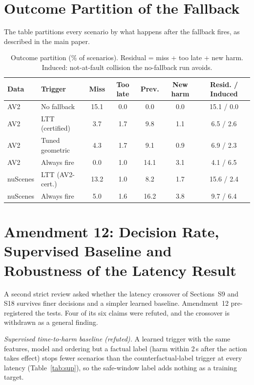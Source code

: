 \documentclass[lettersize,journal]{IEEEtran}
\begin{document}
\section{Outcome Partition of the Fallback}
\label{sec:s-partition}
The table partitions every scenario by what happens after the fallback fires, as described in the main paper.

\begin{table}[h]
\caption{Outcome partition (\% of scenarios). Residual = miss + too late +
new harm. Induced: not-at-fault collision the no-fallback run avoids.}
\label{tab:cost}
\centering
\scriptsize
\setlength{\tabcolsep}{3pt}
\begin{tabular}{llccccc}
\toprule
Data & Trigger & Miss & Too late & Prev. & New harm & Resid. / Induced \\
\midrule
AV2 & No fallback & 15.1 & 0.0 & 0.0 & 0.0 & 15.1 / 0.0 \\
AV2 & LTT (certified) & 3.7 & 1.7 & 9.8 & 1.1 & 6.5 / 2.6 \\
AV2 & Tuned geometric & 4.3 & 1.7 & 9.1 & 0.9 & 6.9 / 2.3 \\
AV2 & Always fire & 0.0 & 1.0 & 14.1 & 3.1 & 4.1 / 6.5 \\
nuScenes & LTT (AV2-cert.) & 13.2 & 1.0 & 8.2 & 1.7 & 15.6 / 2.4 \\
nuScenes & Always fire & 5.0 & 1.6 & 16.2 & 3.8 & 9.7 / 6.4 \\
\bottomrule
\end{tabular}
\end{table}

\section{Amendment 12: Decision Rate, Supervised Baseline and Robustness of the Latency Result}
\label{sec:s-a12}
A second strict review asked whether the latency crossover of Sections~S9
and S18 survives finer decisions and a simpler learned baseline. Amendment~12
pre-registered the tests. Four of its six claims were refuted, and the
crossover is withdrawn as a general finding.

\emph{Supervised time-to-harm baseline (refuted).} A learned trigger with
the same features, model and ordering but a factual label (harm within 2\,s
after the action takes effect) stops fewer scenarios than the
counterfactual-label trigger at every latency (Table~\ref{tab:sup}), so the
safe-window label adds nothing as a training target.
\end{document}
